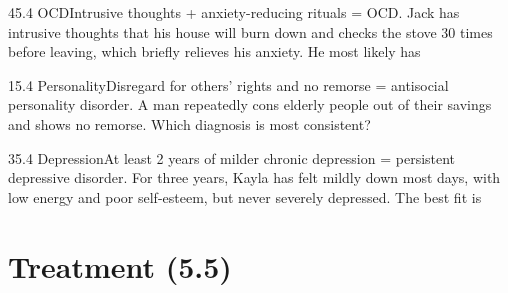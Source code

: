 \documentclass[11pt]{article}
\begin{document}
\begin{q}{4}{5.4 OCD}{Intrusive thoughts + anxiety-reducing rituals = OCD.}
Jack has intrusive thoughts that his house will burn down and checks the stove 30 times before leaving, which briefly relieves his anxiety. He most likely has
\end{q}

\begin{q}{1}{5.4 Personality}{Disregard for others' rights and no remorse = antisocial personality disorder.}
A man repeatedly cons elderly people out of their savings and shows no remorse. Which diagnosis is most consistent?
\end{q}

\begin{q}{3}{5.4 Depression}{At least 2 years of milder chronic depression = persistent depressive disorder.}
For three years, Kayla has felt mildly down most days, with low energy and poor self-esteem, but never severely depressed. The best fit is
\end{q}

\section{Treatment (5.5)}
\end{document}
